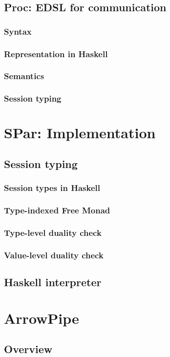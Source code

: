 \documentclass[a4paper, twoside]{report}
\begin{document}
\section{Proc: EDSL for communication}
\subsection{Syntax}
\subsection{Representation in Haskell}
\subsection{Semantics}
\subsection{Session typing}

\chapter{SPar: Implementation}
\section{Session typing}
\subsection{Session types in Haskell}
\subsection{Type-indexed Free Monad}
\subsection{Type-level duality check}
\subsection{Value-level duality check}
\section{Haskell interpreter}

\chapter{ArrowPipe}
\section{Overview}
\end{document}
